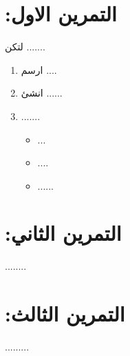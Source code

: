 \documentclass[12pt, a4paper,oneside]{article}
\begin{document}

\section{ :التمرين الاول} 
لتكن ....... 
 \begin{enumerate}
\item  ارسم ....
\item انشئ ......
\item  ....... \\
           \begin{itemize}
             \item  ...
             \item ....
             \item  ......
          \end{itemize}
\end{enumerate} 
\section{ :التمرين الثاني}
........
\section{ :التمرين الثالث}
.........
\end{document}
